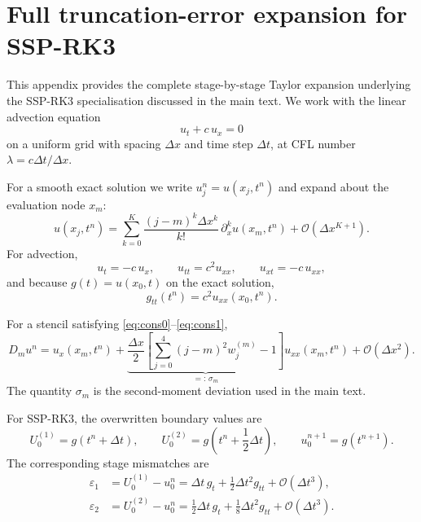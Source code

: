 \documentclass[review,hidelinks,onefignum,onetabnum]{siamart251216}
\newcommand{\Dt}{\Delta t}
\newcommand{\Dx}{\Delta x}
\newcommand{\Order}[1]{\mathcal{O}\!\left(#1\right)}
\begin{document}
\appendix
\section{Full truncation-error expansion for SSP-RK3}
\label{app:expansion}

This appendix provides the complete stage-by-stage Taylor expansion underlying the SSP-RK3 specialisation discussed in the main text. We work with the linear advection equation
\[
u_t+c\,u_x=0
\]
on a uniform grid with spacing $\Dx$ and time step $\Dt$, at CFL number $\lambda=c\Dt/\Dx$.

For a smooth exact solution we write $u_j^n=u(x_j,t^n)$ and expand about the evaluation node $x_m$:
\begin{equation}
  u(x_j,t^n)=\sum_{k=0}^{K}\frac{(j-m)^k\Dx^k}{k!}\,\partial_x^k u(x_m,t^n)
  + \Order{\Dx^{K+1}}.
  \label{eq:app-taylor-space}
\end{equation}
For advection,
\begin{equation}
  u_t=-c\,u_x,\qquad u_{tt}=c^2u_{xx},\qquad u_{xt}=-c\,u_{xx},
  \label{eq:app-adv-ids}
\end{equation}
and because $g(t)=u(x_0,t)$ on the exact solution,
\[
g_{tt}(t^n)=c^2u_{xx}(x_0,t^n).
\]

For a stencil satisfying \eqref{eq:cons0}--\eqref{eq:cons1},
\begin{equation}
  D_m u^n
  = u_x(x_m,t^n)
    + \underbrace{\frac{\Dx}{2}\left[\sum_{j=0}^{4}(j-m)^2w_j^{(m)}-1\right]}_{=:\,\sigma_m}
      u_{xx}(x_m,t^n)
    + \Order{\Dx^2}.
  \label{eq:app-stencil-action}
\end{equation}
The quantity $\sigma_m$ is the second-moment deviation used in the main text.

For SSP-RK3, the overwritten boundary values are
\[
U_0^{(1)}=g(t^n+\Dt),\qquad U_0^{(2)}=g\!\left(t^n+\frac{1}{2}\Dt\right),
\qquad u_0^{n+1}=g(t^{n+1}).
\]
The corresponding stage mismatches are
\begin{align}
  \varepsilon_1 &= U_0^{(1)}-u_0^n
  = \Dt\,g_t+\frac{1}{2}\Dt^2 g_{tt}+\Order{\Dt^3},
  \label{eq:app-eps1}\\
  \varepsilon_2 &= U_0^{(2)}-u_0^n
  = \frac{1}{2}\Dt\,g_t+\frac{1}{8}\Dt^2 g_{tt}+\Order{\Dt^3}.
  \label{eq:app-eps2}
\end{align}
\end{document}
